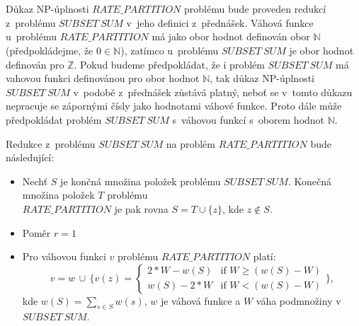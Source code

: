 \documentclass[a4paper]{article}
\newcommand{\rp}{RATE\_PARTITION}
\newcommand{\sbs}{SUBSET\ SUM}
\begin{document}
\section*{}
Důkaz NP-úplnosti $\rp$ problému bude proveden redukcí z~problému $\sbs$ v~jeho definici z~přednášek.
Váhová funkce u~problému $\rp$ má jako obor hodnot definován obor $\mathbb{N}$ (předpokládejme, že $0 \in \mathbb{N}$), zatímco u~problému
$\sbs$ je obor hodnot definován pro $\mathbb{Z}$.
Pokud budeme předpokládat, že i problém $\sbs$ má vahovou funkci definovánou pro obor hodnot $\mathbb{N}$, tak důkaz NP-úplnosti
$\sbs$ v~podobě z~přednášek zůstává platný, neboť se v~tomto důkazu nepracuje se zápornými čísly jako hodnotami váhové funkce.
Proto dále může předpokládat problém $\sbs$ s~váhovou funkcí s~oborem hodnot $\mathbb{N}$.

Redukce z~problému $\sbs$ na problém $\rp$ bude následující:
\begin{itemize}
\item Nechť $S$ je končná množina položek problému $\sbs$.
Konečná množina položek $T$ problému\\ $\rp$ je pak rovna $S=T \cup \{z\}$,
kde $z \not \in S$.
\item Poměr $r=1$
\item Pro váhovou funkci $v$ problému $\rp$ platí:\\
        $$v=w\, \cup\, \{
    v(z) = 
        \begin{cases}
            2*W-w(S) &\mbox{if } W \geq (w(S)-W) \\
            w(S)-2*W & \mbox{if } W < (w(S)-W) 
        \end{cases}
\},$$
kde $w(S) = \sum_{s\in S} w(s)$, $w$ je váhová funkce a $W$ váha podmnožiny v~$\sbs$.
\end{itemize}
\end{document}
